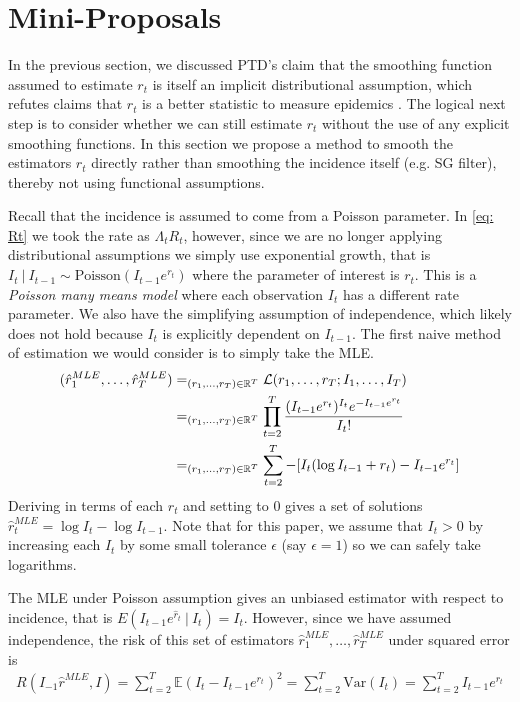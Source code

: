 \documentclass[12pt]{article}
\let\argmin\relax\DeclareMathOperator*{\argmin}{argmin}
\let\argmax\relax\DeclareMathOperator*{\argmax}{argmax}
\begin{document}
      \newpage

  \section{Mini-Proposals}
      In the previous section, we discussed PTD's claim that the smoothing function assumed to estimate $r_t$ is itself an implicit
      distributional assumption, which refutes claims that $r_t$ is a better statistic to measure epidemics \citep{Pellis2022}. 
      The logical next step is to consider whether we can still estimate $r_t$ without the use of any explicit smoothing functions.
      In this section we propose a method to smooth the estimators $\hat{r}_t$ directly rather than smoothing the
      incidence itself (e.g. SG filter), thereby not using functional assumptions. 

      Recall that the incidence is assumed to come from a Poisson parameter. In \cref{eq: Rt} we took the rate as
      $\Lambda_t R_t$, however, since we are no longer applying distributional assumptions we simply
      use exponential growth, that is $I_t \ |\ I_{t-1} \sim \text{Poisson}(I_{t - 1}e^{r_t})$ where the parameter of interest is $r_t$.
      This is a \textit{Poisson many means model} where each observation $I_t$ has a different rate parameter. We also have the
      simplifying assumption of independence, which likely does not hold because $I_t$ is explicitly dependent on $I_{t - 1}$.
      The first naive method of estimation we would consider is to simply take the MLE.
      \begin{align} \label{rt: MLE}
          (\hat{r}_1^{MLE},\dots,\hat{r}_T^{MLE}) &= \argmax_{(r_1,\dots,r_T) \in \mathbb{R}^T} \mathcal{L}(r_1,\dots,r_T ; I_1,\dots,I_T) \\
          &= \argmax_{(r_1,\dots,r_T) \in \mathbb{R}^T} \prod_{t = 2}^T \frac{(I_{t - 1}e^{r_t})^{I_t} e^{-I_{t - 1}e^{r_t}}}{I_t!} \\
          &= \argmin_{(r_1,\dots,r_T) \in \mathbb{R}^T} \sum_{t = 2}^T -[I_t(\log{I_{t - 1}} + r_t) - I_{t - 1}e^{r_t}]
      \end{align}
      Deriving in terms of each $r_t$ and setting to 0 gives a set of solutions
      $\hat{r}_t^{MLE} = \log{I_t} - \log{I_{t - 1}}$. Note that for this paper, we assume that 
      $I_t > 0$ by increasing each $I_t$ by some small tolerance $\epsilon$ (say $\epsilon = 1$) so we can safely take logarithms.

      The MLE under Poisson assumption gives an unbiased estimator with respect to incidence, that is $E(I_{t - 1}e^{\hat{r}_t} \ |\ I_t) = I_t$. 
      However, since we have assumed independence, the risk of this set of estimators $\hat{r}_1^{MLE},\dots,\hat{r}_T^{MLE}$ under squared error is
      \begin{align}
        R(I_{-1}\hat{r}^{MLE}, I) = \sum_{t = 2}^T \mathbb{E}(I_t - I_{t - 1}e^{r_t})^2 = \sum_{t = 2}^T \text{Var}(I_t) = \sum_{t = 2}^T I_{t - 1}e^{r_t}
      \end{align}
\end{document}
